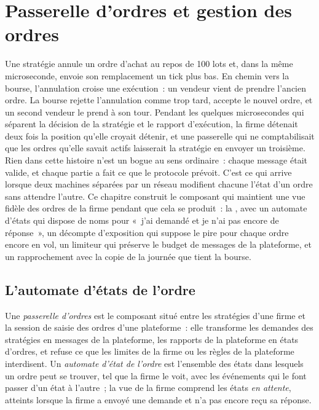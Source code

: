 \chapter{Passerelle d'ordres et gestion des ordres}\label{ch:ll:order-gateway-and-order-management}

Une stratégie annule un ordre d'achat au repos de 100 lots et, dans la même microseconde, envoie son remplacement un tick plus bas. En
chemin vers la bourse, l'annulation croise une exécution~: un vendeur vient de prendre l'ancien ordre. La bourse rejette l'annulation comme
trop tard, accepte le nouvel ordre, et un second vendeur le prend à son tour. Pendant les quelques microsecondes qui séparent la décision de la stratégie et le
rapport d'exécution, la firme détenait deux fois la position qu'elle croyait détenir, et une passerelle qui ne comptabilisait que les ordres qu'elle savait actifs
laisserait la stratégie en envoyer un troisième. Rien dans cette histoire n'est un bogue au sens ordinaire~: chaque message était valide,
et chaque partie a fait ce que le protocole prévoit. C'est ce qui arrive lorsque deux machines séparées par un réseau modifient chacune l'état d'un ordre
sans attendre l'autre. Ce chapitre construit le composant qui maintient une vue fidèle des ordres de la firme pendant que
cela se produit~: la , avec un automate d'états qui dispose de noms pour «~j'ai demandé et je n'ai pas encore de réponse~», un décompte d'exposition
qui suppose le pire pour chaque ordre encore en vol, un limiteur qui préserve le budget de messages de la plateforme, et un
rapprochement avec la copie de la journée que tient la bourse.

\section{L'automate d'états de l'ordre}

\begin{definition}\label{def:ll:order-gateway-and-order-management:gateway}
Une \emph{passerelle d'ordres} est le composant situé entre les stratégies d'une firme et la session de saisie des ordres d'une plateforme~:
elle transforme les demandes des stratégies en messages de la plateforme, les rapports de la plateforme en états d'ordres, et refuse ce que les limites de la firme
ou les règles de la plateforme interdisent. Un \emph{automate d'état de l'ordre} est l'ensemble des états dans lesquels un ordre peut
se trouver, tel que la firme le voit, avec les événements qui le font passer d'un état à l'autre~; la vue de la firme comprend les états \emph{en attente},
atteints lorsque la firme a envoyé une demande et n'a pas encore reçu sa réponse.
\end{definition}

